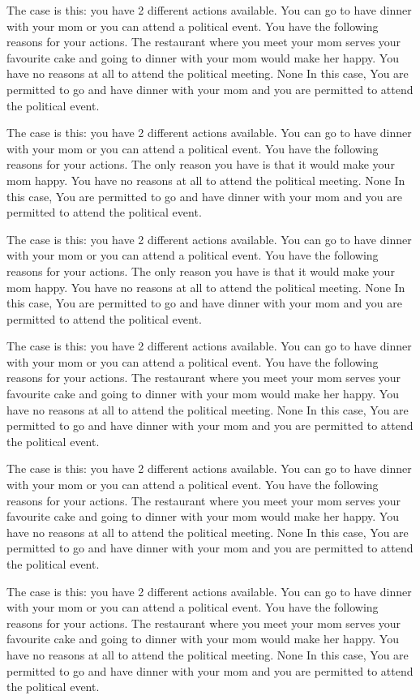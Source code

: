 The case is this: you have  2  different actions available.  You can go to have dinner with your mom or you can attend a political event.
You have the following reasons for your actions.  The restaurant where you meet your mom serves your favourite cake and going to dinner with your mom would make her happy. You have no reasons at all to attend the political meeting. 
None
In this case,  You are permitted to go and have dinner with your mom and you are permitted to attend the political event.
 
The case is this: you have  2  different actions available.  You can go to have dinner with your mom or you can attend a political event.
You have the following reasons for your actions.  The only reason you have is that it would make your mom happy. You have no reasons at all to attend the political meeting. 
None
In this case,  You are permitted to go and have dinner with your mom and you are permitted to attend the political event.
 
The case is this: you have  2  different actions available.  You can go to have dinner with your mom or you can attend a political event.
You have the following reasons for your actions.  The only reason you have is that it would make your mom happy. You have no reasons at all to attend the political meeting. 
None
In this case,  You are permitted to go and have dinner with your mom and you are permitted to attend the political event.
 
The case is this: you have  2  different actions available.  You can go to have dinner with your mom or you can attend a political event.
You have the following reasons for your actions.  The restaurant where you meet your mom serves your favourite cake and going to dinner with your mom would make her happy. You have no reasons at all to attend the political meeting. 
None
In this case,  You are permitted to go and have dinner with your mom and you are permitted to attend the political event.
 
The case is this: you have  2  different actions available.  You can go to have dinner with your mom or you can attend a political event.
You have the following reasons for your actions.  The restaurant where you meet your mom serves your favourite cake and going to dinner with your mom would make her happy. You have no reasons at all to attend the political meeting. 
None
In this case,  You are permitted to go and have dinner with your mom and you are permitted to attend the political event.
 
The case is this: you have  2  different actions available.  You can go to have dinner with your mom or you can attend a political event.
You have the following reasons for your actions.  The restaurant where you meet your mom serves your favourite cake and going to dinner with your mom would make her happy. You have no reasons at all to attend the political meeting. 
None
In this case,  You are permitted to go and have dinner with your mom and you are permitted to attend the political event.
 
